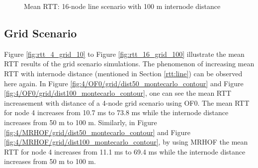 \begin{figure}[p]
  \centering
    \leavevmode
  \caption{Mean RTT: 16-node line scenario with 100 m internode distance}
 \label{fig:rtt_16_line_100}
\end{figure}


\clearpage
\subsection{Grid Scenario}
\label{rtt:grid}

Figure \ref{fig:rtt_4_grid_10} to Figure \ref{fig:rtt_16_grid_100} illustrate the mean RTT results of the grid scenario simulations. The phenomenon of increasing mean RTT with internode distance (mentioned in Section \ref{rtt:line}) can be observed here again. In Figure \ref{fig:4/OF0/grid/dist50_montecarlo_contour} and Figure \ref{fig:4/OF0/grid/dist100_montecarlo_contour}, one can see the mean RTT increasement with distance of a 4-node grid scenario using OF0. The mean RTT for node 4 increases from  10.7 ms to 73.8 ms while the internode distance increases from 50 m to 100 m. Similarly, in Figure \ref{fig:4/MRHOF/grid/dist50_montecarlo_contour} and Figure \ref{fig:4/MRHOF/grid/dist100_montecarlo_contour}, by using MRHOF the mean RTT for node 4 increases from  11.1 ms to 69.4 ms while the internode distance increases from 50 m to 100 m.

